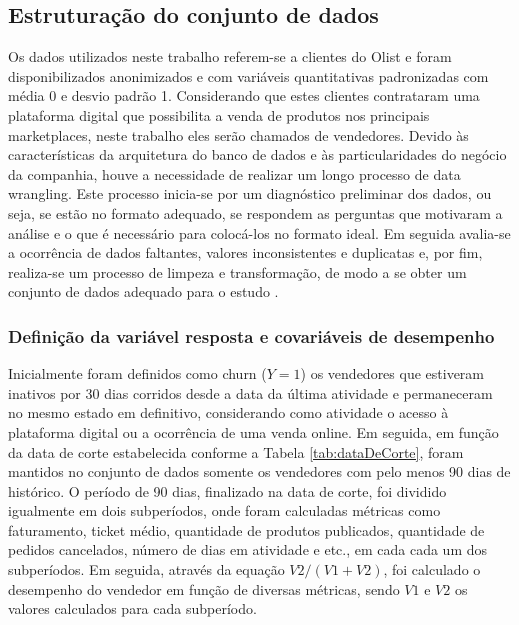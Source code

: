 \documentclass[twocolumn]{rbef}
\newcommand{\1}{\mathbbm{1}}
\begin{document}
\hypertarget{estruturauxe7uxe3o-do-conjunto-de-dados}{%
\subsection{Estruturação do conjunto de dados}\label{estruturauxe7uxe3o-do-conjunto-de-dados}}

Os dados utilizados neste trabalho referem-se a clientes do Olist e foram disponibilizados anonimizados e com variáveis quantitativas padronizadas com média 0 e desvio padrão 1. Considerando que estes clientes contrataram uma plataforma digital que possibilita a venda de produtos nos principais marketplaces, neste trabalho eles serão chamados de vendedores. Devido às características da arquitetura do banco de dados e às particularidades do negócio da companhia, houve a necessidade de realizar um longo processo de data wrangling. Este processo inicia-se por um diagnóstico preliminar dos dados, ou seja, se estão no formato adequado, se respondem as perguntas que motivaram a análise e o que é necessário para colocá-los no formato ideal. Em seguida avalia-se a ocorrência de dados faltantes, valores inconsistentes e duplicatas e, por fim, realiza-se um processo de limpeza e transformação, de modo a se obter um conjunto de dados adequado para o estudo \cite{Kandel2011}.

\hypertarget{definiuxe7uxe3o-da-variuxe1vel-resposta-e-covariuxe1veis-de-desempenho}{%
\subsubsection{Definição da variável resposta e covariáveis de desempenho}\label{definiuxe7uxe3o-da-variuxe1vel-resposta-e-covariuxe1veis-de-desempenho}}

Inicialmente foram definidos como churn (\(Y=1\)) os vendedores que estiveram inativos por 30 dias corridos desde a data da última atividade e permaneceram no mesmo estado em definitivo, considerando como atividade o acesso à plataforma digital ou a ocorrência de uma venda online. Em seguida, em função da data de corte estabelecida conforme a Tabela \ref{tab:dataDeCorte}, foram mantidos no conjunto de dados somente os vendedores com pelo menos 90 dias de histórico. O período de 90 dias, finalizado na data de corte, foi dividido igualmente em dois subperíodos, onde foram calculadas métricas como faturamento, ticket médio, quantidade de produtos publicados, quantidade de pedidos cancelados, número de dias em atividade e etc., em cada cada um dos subperíodos. Em seguida, através da equação \(V2 / (V1 + V2)\), foi calculado o desempenho do vendedor em função de diversas métricas, sendo \(V1\) e \(V2\) os valores calculados para cada subperíodo.
\end{document}
